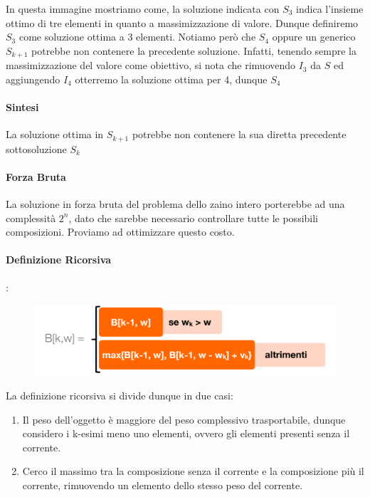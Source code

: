 \documentclass{article}
\begin{document}
In questa immagine mostriamo come, la soluzione indicata con $S_{3}$
indica l'insieme ottimo di tre elementi in quanto a massimizzazione di valore. Dunque definiremo $S_{3}$ come soluzione ottima a 3 elementi. Notiamo però che $S_{4}$ oppure un generico $S_{k+1}$ potrebbe non contenere la precedente soluzione. Infatti, tenendo sempre la massimizzazione del valore come obiettivo, si nota che rimuovendo $I_{3}$ da $S$ ed aggiungendo $I_{4}$ otterremo la soluzione ottima per 4, dunque $S_{4}$

\paragraph{Sintesi} La soluzione ottima in $S_{k+1}$ potrebbe non contenere la sua diretta precedente sottosoluzione $S_{k}$

\paragraph{Forza Bruta} La soluzione in forza bruta del problema dello zaino intero porterebbe ad una complessità $2^{n}$, dato che sarebbe necessario controllare tutte le possibili composizioni. Proviamo ad ottimizzare questo costo.

\newpage

\paragraph{Definizione Ricorsiva}:

\begin{figure}[htbp]
        \center
        \includegraphics[scale=0.4]{img/zaino3.png}
\end{figure}

La definizione ricorsiva si divide dunque in due casi:

\begin{enumerate}
    \item Il peso dell'oggetto è maggiore del peso complessivo trasportabile, dunque considero i k-esimi meno uno elementi, ovvero gli elementi presenti senza il corrente.
    \item Cerco il massimo tra la composizione senza il corrente e la composizione più il corrente, rimuovendo un elemento dello stesso peso del corrente.
\end{enumerate}
\end{document}
